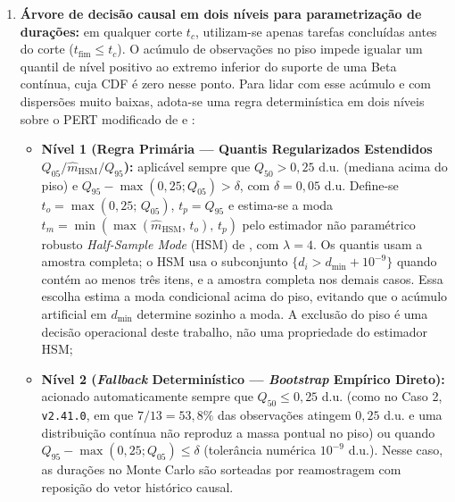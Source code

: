 \documentclass[12pt,openany,oneside,a4paper,english,brazilian,sumario=tradicional]{abntex2}
\begin{document}
\begin{enumerate}
\begin{equation}
  \end{equation}
  onde $S(t_c)$ é o conjunto de tarefas do marco já abertas ou conhecidas até o instante $t_c$. A métrica primária de acurácia do simulador é calculada sobre $y_{\mathrm{congelado}}(t_c)$ (isolando a capacidade preditiva sobre o escopo conhecido em $t_c$), enquanto a razão de inflação de escopo $\rho_{\mathrm{escopo}}(t_c) = |S(T) \setminus S(t_c)| / |S(t_c)|$ e o erro contra $y_{\mathrm{release}}$ são reportados separadamente;
  \item \textbf{Árvore de decisão causal em dois níveis para parametrização de durações:} em qualquer corte $t_c$, utilizam-se apenas tarefas concluídas antes do corte ($t_{\mathrm{fim}} \le t_c$). O acúmulo de observações no piso impede igualar um quantil de nível positivo ao extremo inferior do suporte de uma Beta contínua, cuja CDF é zero nesse ponto. Para lidar com esse acúmulo e com dispersões muito baixas, adota-se uma regra determinística em dois níveis sobre o PERT modificado de  e :
  \begin{itemize}
    \item \textbf{Nível 1 (Regra Primária --- Quantis Regularizados Estendidos $Q_{05}/\hat{m}_{\mathrm{HSM}}/Q_{95}$):} aplicável sempre que $Q_{50} > 0{,}25$ d.u. (mediana acima do piso) e $Q_{95}-\max(0{,}25;Q_{05}) > \delta$, com $\delta=0{,}05$ d.u. Define-se $t_o = \max(0{,}25;\,Q_{05})$, $t_p = Q_{95}$ e estima-se a moda $t_m = \min(\max(\hat{m}_{\mathrm{HSM}},\,t_o),\,t_p)$ pelo estimador não paramétrico robusto \textit{Half-Sample Mode} (HSM) de , com $\lambda=4$. Os quantis usam a amostra completa; o HSM usa o subconjunto $\{d_i>d_{\min}+10^{-9}\}$ quando contém ao menos três itens, e a amostra completa nos demais casos. Essa escolha estima a moda condicional acima do piso, evitando que o acúmulo artificial em $d_{\min}$ determine sozinho a moda. A exclusão do piso é uma decisão operacional deste trabalho, não uma propriedade do estimador HSM;
    \item \textbf{Nível 2 (\textit{Fallback} Determinístico --- \textit{Bootstrap} Empírico Direto):} acionado automaticamente sempre que $Q_{50} \le 0{,}25$ d.u. (como no Caso 2, \texttt{v2.41.0}, em que $7/13 = 53{,}8\%$ das observações atingem $0{,}25$ d.u. e uma distribuição contínua não reproduz a massa pontual no piso) ou quando $Q_{95}-\max(0{,}25;Q_{05})\le\delta$ (tolerância numérica $10^{-9}$ d.u.). Nesse caso, as durações no Monte Carlo são sorteadas por reamostragem com reposição do vetor histórico causal.

\end{itemize}
\end{enumerate}
\end{document}
